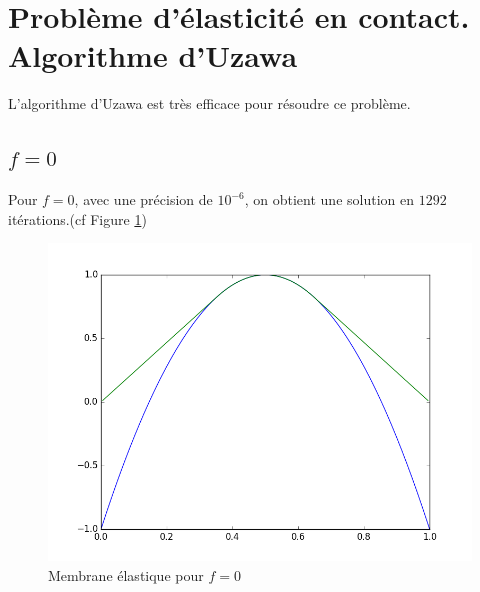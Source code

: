 \documentclass[paper=a4, fontsize=11pt]{article}
\begin{document}
\section{Problème d'élasticité en contact. Algorithme d'Uzawa}
L'algorithme d'Uzawa est très efficace pour résoudre ce problème.
\subsection{$f=0$}
Pour $f=0$, avec une précision de $10^{-6}$, on obtient une solution en $1292$ itérations.(cf Figure \ref{étiquette2})
\begin{figure}
 	\begin{center}
   \includegraphics[scale=0.6]{uzawa_0}
   \end{center}
   \caption{\label{étiquette2} Membrane élastique pour $f=0$ }
\end{figure}
\end{document}
